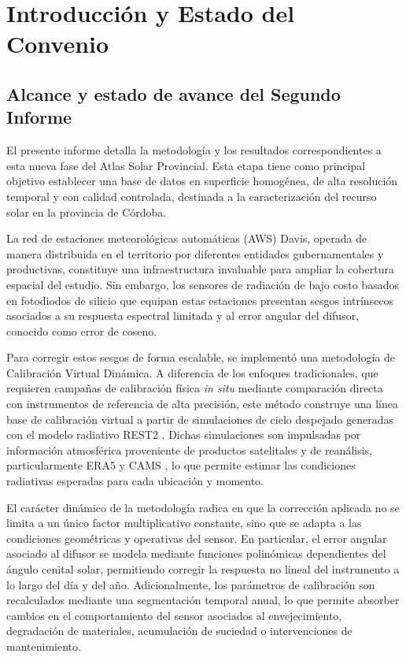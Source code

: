 \documentclass[../main.tex]{subfiles}
\begin{document}
\bigskip

\newpage

\tableofcontents

\newpage

\section{Introducción y Estado del Convenio}

\subsection{Alcance y estado de avance del Segundo Informe}

El presente informe detalla la metodología y los resultados correspondientes a esta nueva fase del Atlas Solar Provincial. Esta etapa tiene como principal objetivo establecer una base de datos en superficie homogénea, de alta resolución temporal y con calidad controlada, destinada a la caracterización del recurso solar en la provincia de Córdoba.

La red de estaciones meteorológicas automáticas (AWS) Davis, operada de manera distribuida en el territorio por diferentes entidades gubernamentales y productivas, constituye una infraestructura invaluable para ampliar la cobertura espacial del estudio. Sin embargo, los sensores de radiación de bajo costo basados en fotodiodos de silicio que equipan estas estaciones presentan sesgos intrínsecos asociados a su respuesta espectral limitada y al error angular del difusor, conocido como error de coseno.

Para corregir estos sesgos de forma escalable, se implementó una metodología de Calibración Virtual Dinámica. A diferencia de los enfoques tradicionales, que requieren campañas de calibración física \textit{in situ} mediante comparación directa con instrumentos de referencia de alta precisión, este método construye una línea base de calibración virtual a partir de simulaciones de cielo despejado generadas con el modelo radiativo REST2 \cite{gueymard_2008_rest2}. Dichas simulaciones son impulsadas por información atmosférica proveniente de productos satelitales y de reanálisis, particularmente ERA5 \cite{hersbach_2020_era5} y CAMS \cite{inness_2019_cams}, lo que permite estimar las condiciones radiativas esperadas para cada ubicación y momento.

El carácter dinámico de la metodología radica en que la corrección aplicada no se limita a un único factor multiplicativo constante, sino que se adapta a las condiciones geométricas y operativas del sensor. En particular, el error angular asociado al difusor se modela mediante funciones polinómicas dependientes del ángulo cenital solar, permitiendo corregir la respuesta no lineal del instrumento a lo largo del día y del año. Adicionalmente, los parámetros de calibración son recalculados mediante una segmentación temporal anual, lo que permite absorber cambios en el comportamiento del sensor asociados al envejecimiento, degradación de materiales, acumulación de suciedad o intervenciones de mantenimiento.
\end{document}
